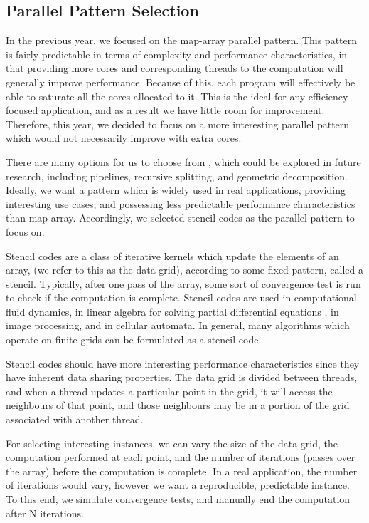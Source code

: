 \subsection{Parallel Pattern Selection}
\label{section:design:parallel_pattern_selection}

In the previous year, we focused on the map-array parallel pattern. This pattern is fairly predictable in terms of complexity and performance characteristics, in that providing more cores and corresponding threads to the computation will generally improve performance. Because of this, each program will effectively be able to saturate all the cores allocated to it. This is the ideal for any efficiency focused application, and as a result we have little room for improvement. Therefore, this year, we decided to focus on a more interesting parallel pattern which would not necessarily improve with extra cores.

There are many options for us to choose from \cite{parallel_patterns_examples1} \cite{parallel_patterns_examples2}, which could be explored in future research, including pipelines, recursive splitting, and geometric decomposition. Ideally, we want a pattern which is widely used in real applications, providing interesting use cases, and possessing less predictable performance characteristics than map-array. Accordingly, we selected stencil codes as the parallel pattern to focus on.

Stencil codes are a class of iterative kernels which update the elements of an array, (we refer to this as the data grid), according to some fixed pattern, called a stencil. Typically, after one pass of the array, some sort of convergence test is run to check if the computation is complete. Stencil codes are used in computational fluid dynamics, in linear algebra for solving partial differential equations \cite{yang_mittal_2014} \cite{anzt_dongarra_quintana-ort_2015} \cite{wang_2015}, in image processing, and in cellular automata. In general, many algorithms which operate on finite grids can be formulated as a stencil code.
 
Stencil codes should have more interesting performance characteristics since they have inherent data sharing properties. The data grid is divided between threads, and when a thread updates a particular point in the grid, it will access the neighbours of that point, and those neighbours may be in a portion of the grid associated with another thread.
 
For selecting interesting instances, we can vary the size of the data grid, the computation performed at each point, and the number of iterations (passes over the array) before the computation is complete. In a real application, the number of iterations would vary, however we want a reproducible, predictable instance. To this end, we simulate convergence tests, and manually end the computation after N iterations.



